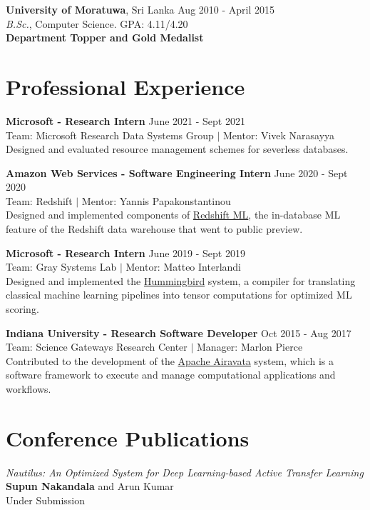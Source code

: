 \documentclass[margin]{res}
\begin{document}
\begin{resume}
\vspace{-5mm}
\textbf{University of Moratuwa}, Sri Lanka \hfill Aug 2010 - April 2015\\
{\sl B.Sc.}, Computer Science. GPA: 4.11/4.20\\
\textbf{Department Topper and Gold Medalist}\\


\vspace{-4mm}
\section{Professional Experience}

\textbf{Microsoft - Research Intern}
\hfill June 2021 - Sept 2021 \\
Team: Microsoft Research Data Systems Group $|$ Mentor: Vivek Narasayya\\
Designed and evaluated resource management schemes for severless databases.

\textbf{Amazon Web Services - Software Engineering Intern}
\hfill June 2020 - Sept 2020 \\
Team: Redshift $|$ Mentor: Yannis Papakonstantinou\\
Designed and implemented components of \href{https://aws.amazon.com/redshift/features/redshift-ml/}{Redshift ML}, the in-database ML feature of the Redshift data warehouse that went to public preview.

\textbf{Microsoft - Research Intern}
\hfill June 2019 - Sept 2019 \\
Team: Gray Systems Lab $|$ Mentor: Matteo Interlandi\\
Designed and implemented the \href{https://github.com/microsoft/hummingbird}{Hummingbird} system, a compiler for translating classical machine learning pipelines into tensor computations for optimized ML scoring.

\textbf{Indiana University - Research Software Developer}
\hfill Oct 2015 - Aug 2017 \\
Team: Science Gateways Research Center $|$ Manager: Marlon Pierce\\
Contributed to the development of the \href{https://airavata.apache.org/index.html}{Apache Airavata} system, which is a software framework to execute and manage computational applications and workflows.

\vspace{-3mm}
\section{Conference Publications}
\par
\textit{Nautilus: An Optimized System for Deep Learning-based Active Transfer Learning} \\
\textbf{Supun Nakandala} and Arun Kumar\\
Under Submission


\end{resume}
\end{document}
